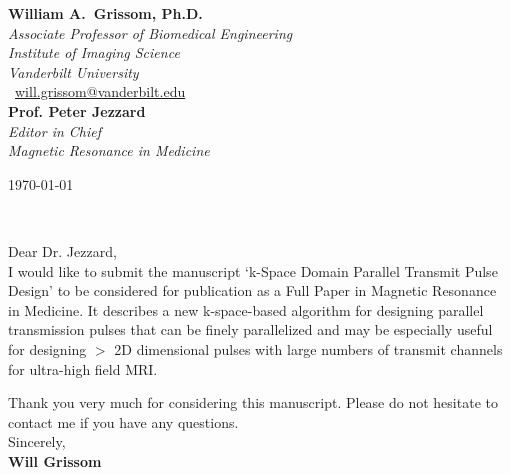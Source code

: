 \documentclass[11pt]{article}
\def\firstname{William A.}
\def\familyname{Grissom, Ph.D.}
\begin{document}
\sffamily   %
\raggedright%
{\bfseries \firstname~\familyname}\\[.35ex]
\small{\itshape%
Associate Professor of Biomedical Engineering\\
Institute of Imaging Science\\
Vanderbilt University\\}
\Letter~\href{mailto:will.grissom@vanderbilt.edu}{will.grissom@vanderbilt.edu}\\[2em]
{\bfseries Prof. Peter Jezzard}\\[.35ex]
\small{\itshape
Editor in Chief\\
Magnetic Resonance in Medicine\\[1em]}
%
\large
\hfill\begin{minipage}[t]{\textwidth} %
\raggedleft %
\today
\end{minipage}\\[2em]
\raggedright
Dear Dr. Jezzard,\\[1.5em]
%
I would like to submit the manuscript `k-Space Domain Parallel Transmit Pulse Design' to be considered
for publication as a Full Paper in Magnetic Resonance in Medicine. 
It describes a new k-space-based algorithm for designing parallel transmission pulses that can be finely parallelized
and may be especially useful for designing $>$ 2D dimensional pulses with large numbers of transmit channels
for ultra-high field MRI. 

\par Thank you very much for considering this manuscript. 
Please do not hesitate to contact me if you have any questions.\\[1.5em]
% 
Sincerely,\\[1.5em] %
%
{\bfseries Will Grissom}\\
%
\vfill%
\end{document}
